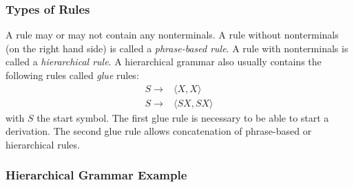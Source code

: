 \subsubsection{Types of Rules}
\label{sec:hieroTypesOfRules}

A rule may or may not contain any nonterminals.
A rule without nonterminals (on the right hand side) is
called a \emph{phrase-based rule}. A rule with nonterminals
is called a \emph{hierarchical rule}.
A hierarchical grammar also usually contains the following rules
called \emph{glue} rules:
%
\begin{align}
  S \rightarrow& \langle X, X \rangle \nonumber \\
  S \rightarrow& \langle S X, S X \rangle \nonumber
\end{align}
%
with $S$ the start symbol. The first glue rule is necessary to
be able to start a derivation.
The second glue rule allows concatenation of phrase-based or
hierarchical rules.

%

\subsubsection{Hierarchical Grammar Example}

